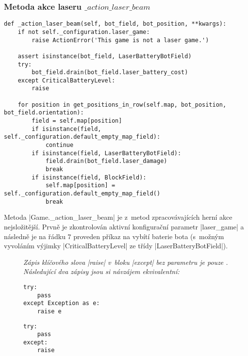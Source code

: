 \subsubsection{Metoda akce laseru $\_action\_laser\_beam$}
\label{subsubsec:action-laser-beam}
\vspace{-10pt}
\begin{lstlisting}[caption={Metoda $Game.\_action\_laser\_beam$},label={lst:game-action-laser-beam}]
def _action_laser_beam(self, bot_field, bot_position, **kwargs):
    if not self._configuration.laser_game:
        raise ActionError('This game is not a laser game.')

    assert isinstance(bot_field, LaserBatteryBotField)
    try:
        bot_field.drain(bot_field.laser_battery_cost)
    except CriticalBatteryLevel:
        raise

    for position in get_positions_in_row(self.map, bot_position, bot_field.orientation):
        field = self.map[position]
        if isinstance(field, self._configuration.default_empty_map_field):
            continue
        if isinstance(field, LaserBatteryBotField):
            field.drain(bot_field.laser_damage)
            break
        if isinstance(field, BlockField):
            self.map[position] = self._configuration.default_empty_map_field()
            break
\end{lstlisting}

Metoda \ic|Game._action_laser_beam| je z~metod zpracovávajících herní akce nejsložitější. Prvně je zkontrolován aktivní konfigurační parametr \ic|laser_game| a následně je na řádku $7$ proveden příkaz na vybítí baterie bota (s~možným vyvoláním výjimky \ic|CriticalBatteryLevel| ze třídy \ic|LaserBatteryBotField|).

\begin{figure}
    {\itshape
    Zápis klíčového slova \ic|raise| v~bloku \ic|except| bez parametru je pouze \footnotemark. Následující dva zápisy jsou si návzájem ekvivalentní:
    }
    \begin{minipage}{.475\textwidth}
    \vspace{10pt}
    \begin{lstlisting}
try:
    pass
except Exception as e:
    raise e
    \end{lstlisting}
    \end{minipage}
    \hfill
    \begin{minipage}{.475\textwidth}
    \vspace{10pt}
    \begin{lstlisting}
try:
    pass
except:
    raise
    \end{lstlisting}
    \end{minipage}
    \vspace{-15pt}
\end{figure}

